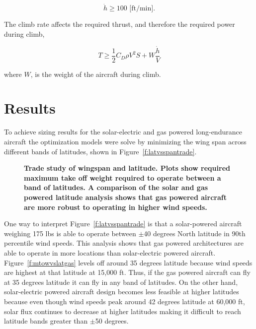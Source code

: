 \documentclass[]{aiaa-tc}%
\begin{document}
\begin{equation}
    \label{e:climbrate}
    \dot{h} \geq 100 \text{ [ft/min]}.
\end{equation}

The climb rate affects the required thrust, and therefore the required power during climb, 

\begin{equation}
    \label{e:climb}
    T \geq \frac{1}{2} C_D \rho V^2 S + W \frac{\dot{h}}{V}
\end{equation}

where $W$, is the weight of the aircraft during climb.  

\section{Results}

To achieve sizing results for the solar-electric and gas powered long-endurance aircraft the optimization models were solve by minimizing the wing span across different bands of latitudes, shown in Figure~\ref{f:latvsspantrade}.

\begin{figure}[H]
 \begin{subfigmatrix}{2}%
 \end{subfigmatrix}
 \caption{\textbf{Trade study of wingspan and latitude. Plots show required maximum take off weight required to operate between a band of latitudes.   A comparison of the solar and gas powered latitude analysis shows that gas powered aircraft are more robust to operating in higher wind speeds.}}
 \label{f:latvsspantradet}
\end{figure}

One way to interpret Figure~\ref{f:latvsspantrade} is that a solar-powered aircraft weighing 175 lbs is able to operate between $\pm$40 degrees North latitude in 90th percentile wind speeds.  
This analysis shows that gas powered architectures are able to operate in more locations than solar-electric powered aircraft.  
Figure~\ref{f:mtowvslatgas} levels off around 35 degrees latitude because wind speeds are highest at that latitude at 15,000 ft. 
Thus, if the gas powered aircraft can fly at 35 degrees latitude it can fly in any band of latitudes.  
On the other hand, solar-electric powered aircraft design becomes less feasible at higher latitudes because even though wind speeds peak around 42 degrees latitude at 60,000 ft, solar flux continues to decrease at higher latitudes making it difficult to reach latitude bands greater than $\pm$50 degrees. 
\end{document}
